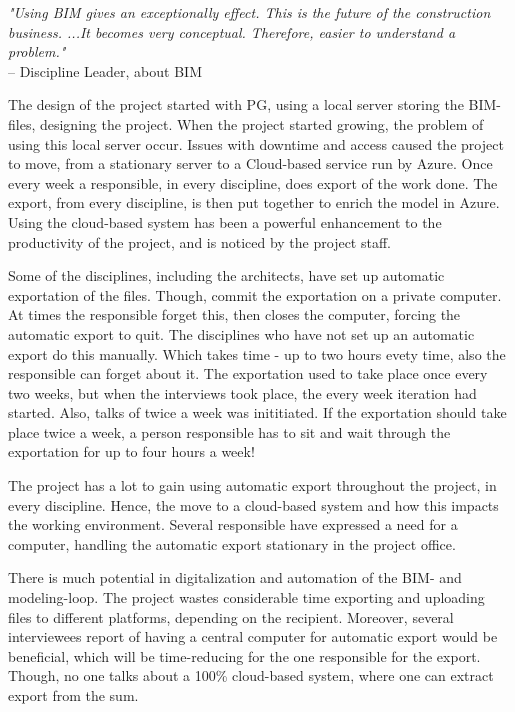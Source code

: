 \textit{"Using BIM gives an exceptionally effect. This is the future of the construction business. ...It becomes very conceptual. Therefore, easier to understand a problem."} \\
– Discipline Leader, about BIM

The design of the project started with PG, using a local server storing the BIM-files, designing the project. When the project started growing, the problem of using this local server occur. Issues with downtime and access caused the project to move, from a stationary server to a Cloud-based service run by Azure. Once every week a responsible, in every discipline, does export of the work done. The export, from every discipline, is then put together to enrich the model in Azure. Using the cloud-based system has been a powerful enhancement to the productivity of the project, and is noticed by the project staff. 

Some of the disciplines, including the architects, have set up automatic exportation of the files. Though, commit the exportation on a private computer. At times the responsible forget this, then closes the computer, forcing the automatic export to quit. The disciplines who have not set up an automatic export do this manually. Which takes time - up to two hours evety time, also the responsible can forget about it. The exportation used to take place once every two weeks, but when the interviews took place, the every week iteration had started. Also, talks of twice a week was inititiated. If the exportation should take place twice a week, a person responsible has to sit and wait through the exportation for up to four hours a week!

The project has a lot to gain using automatic export throughout the project, in every discipline. Hence, the move to a cloud-based system and how this impacts the working environment. Several responsible have expressed a need for a computer, handling the automatic export stationary in the project office. 

There is much potential in digitalization and automation of the BIM- and modeling-loop. The project wastes considerable time exporting and uploading files to different platforms, depending on the recipient. Moreover, several interviewees report of having a central computer for automatic export would be beneficial, which will be time-reducing for the one responsible for the export. Though, no one talks about a 100\% cloud-based system, where one can extract export from the sum. 

